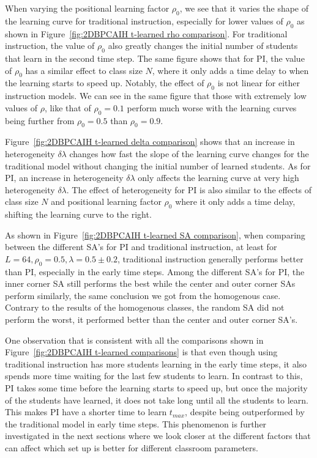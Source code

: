 When varying the positional learning factor $\rho_0$, we see that it varies the shape of the learning curve for traditional instruction, especially for lower values of $\rho_0$ as shown in Figure~\ref{fig:2DBPCAIH t-learned rho comparison}. 
For traditional instruction, the value of $\rho_0$ also greatly changes the initial number of students that learn in the second time step.
The same figure shows that for PI, the value of $\rho_0$ has a similar effect to class size $N$, where it only adds a time delay to when the learning starts to speed up.
Notably, the effect of $\rho_0$ is not linear for either instruction models.
We can see in the same figure that those with extremely low values of $\rho$, like that of $\rho_0=0.1$ perform much worse with the learning curves being further from $\rho_0=0.5$ than $\rho_0=0.9$.

Figure~\ref{fig:2DBPCAIH t-learned delta comparison} shows that an increase in heterogeneity $\delta\lambda$ changes how fast the slope of the learning curve changes for the traditional model without changing the initial number of learned students. 
As for PI, an increase in heterogeneity $\delta\lambda$ only affects the learning curve at very high heterogeneity $\delta\lambda$.
The effect of heterogeneity for PI is also similar to the effects of class size $N$ and positional learning factor $\rho_0$ where it only adds a time delay, shifting the learning curve to the right.

As shown in Figure~\ref{fig:2DBPCAIH t-learned SA comparison}, when comparing between the different SA's for PI and traditional instruction, at least for $L=64, \rho_0=0.5, \lambda=0.5\pm0.2$, traditional instruction generally performs better than PI, especially in the early time steps. 
Among the different SA's for PI, the inner corner SA still performs the best while the center and outer corner SAs perform similarly, the same conclusion we got from the homogenous case.
Contrary to the results of the homogenous classes, the random SA did not perform the worst, it performed better than the center and outer corner SA's.

One observation that is consistent with all the comparisons shown in Figure~\ref{fig:2DBPCAIH t-learned comparisons} is that even though using traditional instruction has more students learning in the early time steps, it also spends more time waiting for the last few students to learn. 
In contrast to this, PI takes some time before the learning starts to speed up, but once the majority of the students have learned, it does not take long until all the students to learn.
This makes PI have a shorter time to learn $t_{max}$, despite being outperformed by the traditional model in early time steps.
This phenomenon is further investigated in the next sections where we look closer at the different factors that can affect which set up is better for different classroom parameters.

